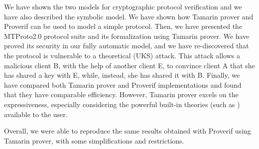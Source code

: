 We have shown the two models for cryptographic protocol verification and we have also described the symbolic model. We have shown how Tamarin prover and Proverif can be used to model a simple protocol. Then, we have presented the MTProto2.0 protocol suite and its formalization using Tamarin prover. We have proved its security in our fully automatic model, and we have re-discovered that the protocol is vulnerable to a theoretical \uks{} (UKS) attack. This attack allows a malicious client B, with the help of another client E, to convince client A that she has shared a key with E, while, instead, she has shared it with B. Finally, we have compared both Tamarin prover and Proverif implementations and found that they have comparable efficiency. However, Tamarin prover excels on the expressiveness, especially considering the powerful built-in theories (such as \DiHe{}) available to the user.

Overall, we were able to reproduce the same results obtained with Proverif using Tamarin prover, with some simplifications and restrictions.